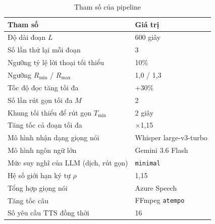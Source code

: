 \documentclass{IEEEtran}
\begin{document}
\begin{table}[t]
\caption{Tham số của pipeline}
\label{tab:params}
\centering
\setlength{\tabcolsep}{4pt}
\begin{tabular}{|l|l|}
\hline
\textbf{Tham số} & \textbf{Giá trị} \\
\hline
Độ dài đoạn $L$ & 600 giây \\
Số lần thử lại mỗi đoạn & 3 \\
Ngưỡng tỷ lệ lời thoại tối thiểu & 10\% \\
Ngưỡng $R_{\min}$ / $R_{\max}$ & 1,0 / 1,3 \\
Tốc độ đọc tăng tối đa & +30\% \\
Số lần rút gọn tối đa $M$ & 2 \\
Khung tối thiểu để rút gọn $T_{\min}$ & 2 giây \\
Tăng tốc cả đoạn tối đa & $\times$1,15 \\
Mô hình nhận dạng giọng nói & Whisper large-v3-turbo \\
Mô hình ngôn ngữ lớn & Gemini 3.6 Flash \\
Mức suy nghĩ của LLM (dịch, rút gọn) & \texttt{minimal} \\
Hệ số giới hạn ký tự $\rho$ & 1,15 \\
Tổng hợp giọng nói & Azure Speech \\
Tăng tốc câu & FFmpeg \texttt{atempo} \\
Số yêu cầu TTS đồng thời & 16 \\
\hline
\end{tabular}
\end{table}
\end{document}
